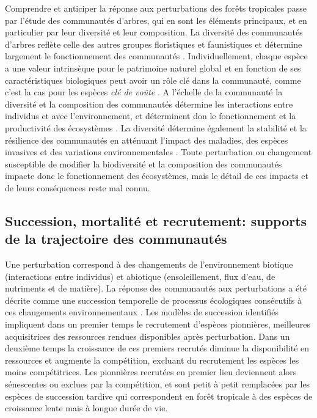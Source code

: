 \documentclass[
  11pt,
  french,
  A4paper,
  extrafontsizes,onecolumn,openright
  ]{memoir}
\begin{document}
Comprendre et anticiper la réponse aux perturbations des forêts
tropicales passe par l'étude des communautés d'arbres, qui en sont les
éléments principaux, et en particulier par leur diversité et leur
composition. La diversité des communautés d'arbres reflète celle des
autres groupes floristiques et faunistiques et détermine largement le
fonctionnement des communautés \autocite{Guitet2017}. Individuellement,
chaque espèce a une valeur intrinsèque pour le patrimoine naturel global
et en fonction de ses caractéristiques biologiques peut avoir un rôle
clé dans la communauté, comme c'est la cas pour les espèces \emph{clé de
voûte} \autocites{Jones1994}{Power1996}{Gardner2007}. A l'échelle de la
communauté la diversité et la composition des communautés détermine les
interactions entre individus et avec l'environnement, et déterminent don
le fonctionnement et la productivité des écosystèmes
\autocite{Begon2006}. La diversité détermine également la stabilité et
la résilience des communautés en atténuant l'impact des maladies, des
espèces invasives et des variations environnementales
\autocite{Elmqvist2003}. Toute perturbation ou changement susceptible de
modifier la biodiversité et la composition des communautés impacte donc
le fonctionnement des écosystèmes, mais le détail de ces impacts et de
leurs conséquences reste mal connu.

\subsection{Succession, mortalité et recrutement: supports de la
trajectoire des
communautés}\label{succession-mortalite-et-recrutement-supports-de-la-trajectoire-des-communautes}

Une perturbation correspond à des changements de l'environnement
biotique (interactions entre individus) et abiotique (ensoleillement,
flux d'eau, de nutriments et de matière). La réponse des communautés aux
perturbations a été décrite comme une succession temporelle de processus
écologiques consécutifs à ces changements environnementaux
\autocite{Clements1916}. Les modèles de succession identifiés impliquent
dans un premier temps le recrutement d'espèces pionnières, meilleures
acquisitrices des ressources rendues disponibles après perturbation.
Dans un deuxième temps la croissance de ces premiers recrutés diminue la
disponibilité en ressources et augmente la compétition, excluant du
recrutement les espèces les moins compétitrices. Les pionnières
recrutées en premier lieu deviennent alors sénescentes ou exclues par la
compétition, et sont petit à petit remplacées par les espèces de
succession tardive qui correspondent en forêt tropicale à des espèces de
croissance lente mais à longue durée de vie.
\end{document}
